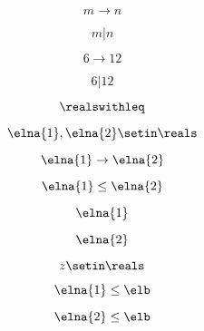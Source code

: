 \begin{forslides}
    \begin{equation}
        \label{eq:feedback-126}
        m\to n
    \end{equation}

    \begin{equation}
        \label{eq:feedback-127}
        m | n
    \end{equation}

    \begin{equation}
        \label{eq:feedback-128}
        6\to 12
    \end{equation}

    \begin{equation}
        \label{eq:feedback-129}
        6 | 12
    \end{equation}

    \begin{equation}
        \label{eq:feedback-130}
        \realswithleq
    \end{equation}

    \begin{equation}
        \label{eq:feedback-131}
        \elna{1},\elna{2}\setin \reals
    \end{equation}

    \begin{equation}
        \label{eq:feedback-132}
        \elna{1}\to \elna{2}
    \end{equation}

    \begin{equation}
        \label{eq:feedback-133}
        \elna{1}\leq \elna{2}
    \end{equation}

    \begin{equation}
        \label{eq:feedback-134}
        \elna{1}
    \end{equation}

    \begin{equation}
        \label{eq:feedback-135}
        \elna{2}
    \end{equation}

    \begin{equation}
        \label{eq:feedback-136}
        z\setin \reals
    \end{equation}

    \begin{equation}
        \label{eq:feedback-137}
        \elna{1}\leq \elb
    \end{equation}

    \begin{equation}
        \label{eq:feedback-138}
        \elna{2}\leq \elb
    \end{equation}


\end{forslides}
